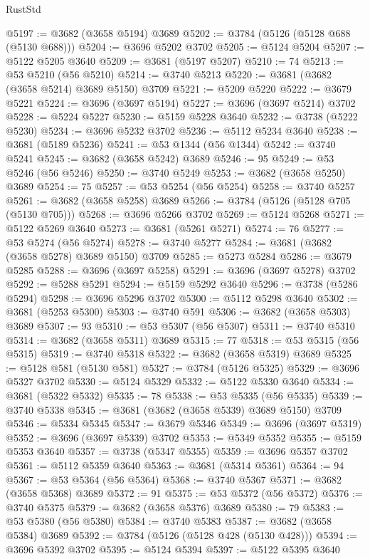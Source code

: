 \begin{lexlean}{RustStd}
\begin{coremodule}
@5197 := @3682 (@3658 @5194) @3689
@5202 := @3784 (@5126 (@5128 @688 (@5130 @688)))
@5204 := @3696 @5202 @3702
@5205 := @5124 @5204
@5207 := @5122 @5205 @3640
@5209 := @3681 (@5197 @5207)
@5210 := 74
@5213 := @53 @5210 (@56 @5210)
@5214 := @3740 @5213
@5220 := @3681 (@3682 (@3658 @5214) @3689 @5150) @3709
@5221 := @5209 @5220
@5222 := @3679 @5221
@5224 := @3696 (@3697 @5194)
@5227 := @3696 (@3697 @5214) @3702
@5228 := @5224 @5227
@5230 := @5159 @5228 @3640
@5232 := @3738 (@5222 @5230)
@5234 := @3696 @5232 @3702
@5236 := @5112 @5234 @3640
@5238 := @3681 (@5189 @5236)
@5241 := @53 @1344 (@56 @1344)
@5242 := @3740 @5241
@5245 := @3682 (@3658 @5242) @3689
@5246 := 95
@5249 := @53 @5246 (@56 @5246)
@5250 := @3740 @5249
@5253 := @3682 (@3658 @5250) @3689
@5254 := 75
@5257 := @53 @5254 (@56 @5254)
@5258 := @3740 @5257
@5261 := @3682 (@3658 @5258) @3689
@5266 := @3784 (@5126 (@5128 @705 (@5130 @705)))
@5268 := @3696 @5266 @3702
@5269 := @5124 @5268
@5271 := @5122 @5269 @3640
@5273 := @3681 (@5261 @5271)
@5274 := 76
@5277 := @53 @5274 (@56 @5274)
@5278 := @3740 @5277
@5284 := @3681 (@3682 (@3658 @5278) @3689 @5150) @3709
@5285 := @5273 @5284
@5286 := @3679 @5285
@5288 := @3696 (@3697 @5258)
@5291 := @3696 (@3697 @5278) @3702
@5292 := @5288 @5291
@5294 := @5159 @5292 @3640
@5296 := @3738 (@5286 @5294)
@5298 := @3696 @5296 @3702
@5300 := @5112 @5298 @3640
@5302 := @3681 (@5253 @5300)
@5303 := @3740 @591
@5306 := @3682 (@3658 @5303) @3689
@5307 := 93
@5310 := @53 @5307 (@56 @5307)
@5311 := @3740 @5310
@5314 := @3682 (@3658 @5311) @3689
@5315 := 77
@5318 := @53 @5315 (@56 @5315)
@5319 := @3740 @5318
@5322 := @3682 (@3658 @5319) @3689
@5325 := @5128 @581 (@5130 @581)
@5327 := @3784 (@5126 @5325)
@5329 := @3696 @5327 @3702
@5330 := @5124 @5329
@5332 := @5122 @5330 @3640
@5334 := @3681 (@5322 @5332)
@5335 := 78
@5338 := @53 @5335 (@56 @5335)
@5339 := @3740 @5338
@5345 := @3681 (@3682 (@3658 @5339) @3689 @5150) @3709
@5346 := @5334 @5345
@5347 := @3679 @5346
@5349 := @3696 (@3697 @5319)
@5352 := @3696 (@3697 @5339) @3702
@5353 := @5349 @5352
@5355 := @5159 @5353 @3640
@5357 := @3738 (@5347 @5355)
@5359 := @3696 @5357 @3702
@5361 := @5112 @5359 @3640
@5363 := @3681 (@5314 @5361)
@5364 := 94
@5367 := @53 @5364 (@56 @5364)
@5368 := @3740 @5367
@5371 := @3682 (@3658 @5368) @3689
@5372 := 91
@5375 := @53 @5372 (@56 @5372)
@5376 := @3740 @5375
@5379 := @3682 (@3658 @5376) @3689
@5380 := 79
@5383 := @53 @5380 (@56 @5380)
@5384 := @3740 @5383
@5387 := @3682 (@3658 @5384) @3689
@5392 := @3784 (@5126 (@5128 @428 (@5130 @428)))
@5394 := @3696 @5392 @3702
@5395 := @5124 @5394
@5397 := @5122 @5395 @3640

\end{coremodule}
\end{lexlean}
